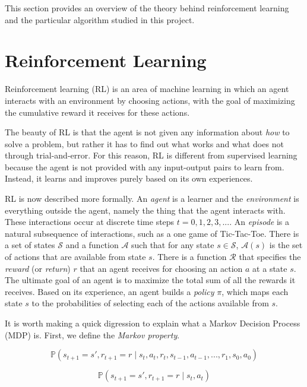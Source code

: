 \documentclass[11pt,a4paper]{report}
\begin{document}
This section provides an overview of the theory behind reinforcement learning and the particular algorithm studied in this project.

\section{Reinforcement Learning}
\label{sec:RL}

Reinforcement learning (RL) is an area of machine learning in which an agent interacts with an environment by choosing actions, with the goal of maximizing the cumulative reward it receives for these actions.

The beauty of RL is that the agent is not given any information about \emph{how} to solve a problem, but rather it has to find out what works and what does not through trial-and-error. For this reason, RL is different from supervised learning because the agent is not provided with any input-output pairs to learn from. Instead, it learns and improves purely based on its own experiences.

RL is now described more formally. An \emph{agent} is a learner and the \emph{environment} is everything outside the agent, namely the thing that the agent interacts with. These interactions occur at discrete time steps $t = 0, 1, 2, 3, ...$. An \emph{episode} is a natural subsequence of interactions, such as a one game of Tic-Tac-Toe. There is a set of states $\mathcal{S}$ and a function $\mathcal{A}$ such that for any state $s \in \mathcal{S}$, $\mathcal{A}(s)$ is the set of actions that are available from state $s$. There is a function $\mathcal{R}$ that specifies the \emph{reward} (or \emph{return}) $r$ that an agent receives for choosing an action $a$ at a state $s$. The ultimate goal of an agent is to maximize the total sum of all the rewards it receives. Based on its experience, an agent builds a \emph{policy} $\pi$, which maps each state $s$ to the probabilities of selecting each of the actions available from $s$.

It is worth making a quick digression to explain what a Markov Decision Process (MDP) is. First, we define the \emph{Markov property}.

\begin{equation}
	\mathbb{P}(s_{t+1} = s', r_{t+1} = r \mid s_t, a_t, r_t, s_{t-1}, a_{t-1}, ... , r_1, s_0, a_0)
 \label{complete-prob-distr}
\end{equation}

\begin{equation}
	\mathbb{P}(s_{t+1} = s', r_{t+1} = r \mid s_t, a_t) \label{partial-prob-distr}
\end{equation}
\end{document}
